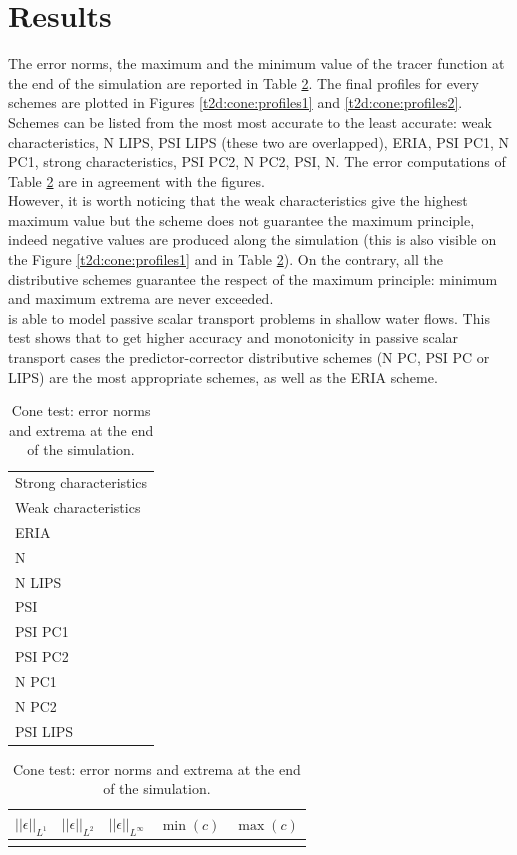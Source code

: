\section{Results}
The error norms, the maximum and the minimum value of the tracer function at the end of the simulation are reported in Table \ref{t2d:cone:tab1}. The final profiles for every schemes are plotted in Figures \ref{t2d:cone:profiles1} and \ref{t2d:cone:profiles2}. Schemes can be listed from the most most accurate to the least accurate: weak characteristics, N LIPS, PSI LIPS (these two are overlapped), ERIA, PSI PC1, N PC1, strong characteristics, PSI PC2, N PC2, PSI, N.
The error computations of Table \ref{t2d:cone:tab1} are in agreement with the figures.\\
However, it is worth noticing that the weak characteristics give the highest maximum value but the scheme does not guarantee the maximum principle, indeed negative values are produced along the simulation (this is also visible on the Figure \ref{t2d:cone:profiles1} and in Table \ref{t2d:cone:tab1}). On the contrary, all the distributive schemes guarantee the respect of the maximum principle: minimum and maximum extrema are never exceeded. \\
 is able to model passive scalar transport problems in shallow water flows. This test shows that to get higher accuracy and monotonicity in passive scalar transport cases the predictor-corrector distributive schemes (N PC, PSI PC or LIPS) are the most appropriate schemes, as well as the ERIA scheme.
%
\begin{table}[H]
\centering
\caption{Cone test: error norms and extrema at the end of the simulation.}
\begin{tabular}{l|}
\\ \hline Strong characteristics \\ Weak characteristics \\ ERIA \\ N \\ N LIPS \\ PSI \\ PSI PC1 \\ PSI PC2 \\ N PC1 \\ N PC2 \\ PSI LIPS
\end{tabular}%
\begin{tabular}{|c|c|c|c|c}
  $||\epsilon||_{L^1}$ & $||\epsilon||_{L^2}$ & $||\epsilon||_{L^{\infty}}$ & $\min(c)$ & $\max(c)$\\
\hline

\label{t2d:cone:tab1}
\end{tabular}
\end{table}
